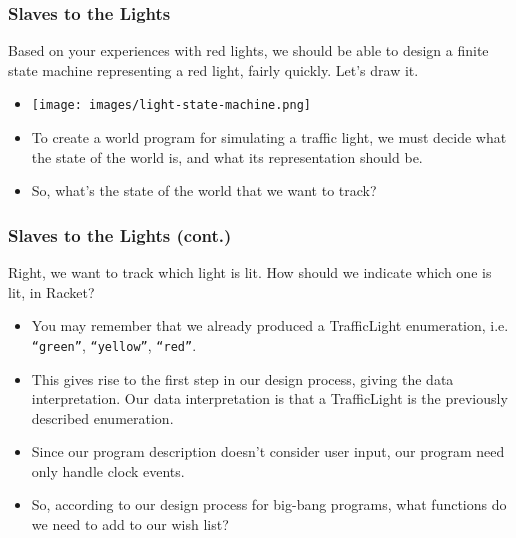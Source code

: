 \documentclass{beamer}
\begin{document}
\begin{frame}
  \frametitle{Slaves to the Lights}
  Based on your experiences with red lights, we should be able to
  design a finite state machine representing a red light, fairly quickly.
  Let's draw it.
  \begin{itemize}
  \item<2-> \texttt{[image: images/light-state-machine.png]}
  \item<3-> To create a world program for simulating a traffic light, we
    must decide what the state of the world is, and what its representation
    should be.
  \item<4-> So, what's the state of the world that we want to track?    
  \end{itemize}
\end{frame}

\begin{frame}
  \frametitle{Slaves to the Lights (cont.)}
  Right, we want to track which light is lit. How should we
  indicate which one is lit, in Racket?
  \begin{itemize}
  \item<2-> You may remember that we already produced a TrafficLight enumeration, i.e.
    \texttt{``green''}, \texttt{``yellow''}, \texttt{``red''}.
  \item<3-> This gives rise to the first step in our design process,
    giving the data interpretation. Our data interpretation is that a TrafficLight
    is the previously described enumeration.
  \item<4-> Since our program description doesn't consider user input, our program
    need only handle clock events.
  \item<5-> So, according to our design process for big-bang programs,
    what functions do we need to add to our wish list?
  \end{itemize}
\end{frame}


\end{document}
